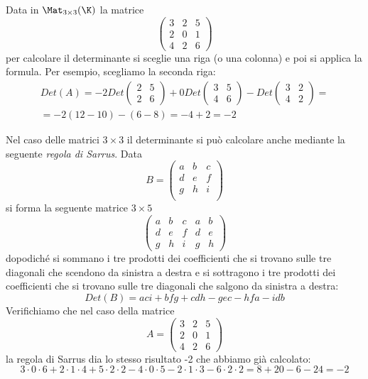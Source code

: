\begin{example}
	Data in $\Mat_{3 \times 3}(\K)$ la matrice
	\[
		\begin{pmatrix}
			3 & 2 & 5 \\
			2 & 0 & 1 \\
			4 & 2 & 6
		\end{pmatrix}
	\]
	per calcolare il determinante si sceglie una riga (o una colonna) e poi si
	applica la formula. Per esempio, scegliamo la seconda riga:
	\begin{gather*}
		Det(A) = -2Det \begin{pmatrix}
			2 & 5 \\
			2 & 6
		\end{pmatrix} +
		0 Det \begin{pmatrix}
			3 & 5 \\
			4 & 6
		\end{pmatrix} -
		Det \begin{pmatrix}
			3 & 2 \\
			4 & 2
		\end{pmatrix} = \\
		= -2(12 - 10) - (6 - 8) = -4 + 2 = -2
	\end{gather*}
\end{example}

\begin{observation}
	Nel caso delle matrici $3 \times 3$ il determinante si può calcolare
	anche mediante la seguente \emph{regola di Sarrus}. Data
	\[
		B = \begin{pmatrix}
			a & b & c \\
			d & e & f \\
			g & h & i \\
		\end{pmatrix}
	\]
	si forma la seguente matrice $3 \times 5$
	\[
		\begin{pmatrix}
			a & b & c & a & b \\
			d & e & f & d & e \\
			g & h & i & g & h
		\end{pmatrix}
	\]
	dopodiché si sommano i tre prodotti dei coefficienti che si trovano sulle
	tre diagonali che scendono da sinistra a destra e si sottragono i tre
	prodotti dei coefficienti che si trovano sulle tre diagonali che salgono
	da sinistra a destra:
	\[
		Det(B) = aci + bfg + cdh - gec - hfa - idb
	\]
	Verifichiamo che nel caso della matrice
	\[
		A = \begin{pmatrix}
			3 & 2 & 5 \\
			2 & 0 & 1 \\
			4 & 2 & 6
		\end{pmatrix}
	\]
	la regola di Sarrus dia lo stesso risultato -2 che abbiamo già calcolato:
	\[
		3 \cdot 0 \cdot 6 + 2 \cdot 1 \cdot 4 + 5 \cdot 2 \cdot 2 -
		4 \cdot 0 \cdot 5 - 2 \cdot 1 \cdot 3 - 6 \cdot 2 \cdot 2 =
		8 + 20 - 6 - 24 = -2
	\]
\end{observation}

